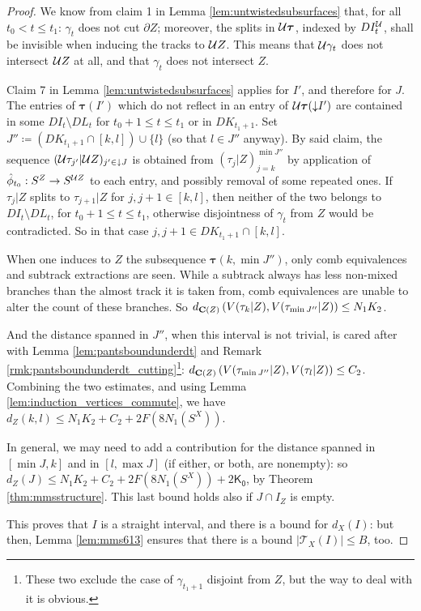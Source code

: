 \begin{proof}
We know from claim 1 in Lemma \ref{lem:untwistedsubsurfaces} that, for all $t_0<t\leq t_1$: $\gamma_t$ does not cut $\partial Z$; moreover, the splits in ${\mathcal U}\bm\tau$, indexed by $DI_t^{\mathcal U}$, shall be invisible when inducing the tracks to ${\mathcal U} Z$. This means that ${\mathcal U}\gamma_t$ does not intersect ${\mathcal U} Z$ at all, and that $\gamma_t$ does not intersect $Z$.

Claim 7 in Lemma \ref{lem:untwistedsubsurfaces} applies for $I'$, and therefore for $J$. The entries of $\bm\tau(I')$ which do not reflect in an entry of ${\mathcal U}\bm\tau(\mathord{\downarrow} I')$ are contained in some $DI_t\setminus DL_t$ for $t_0+1\leq t\leq t_1$ or in $DK_{t_1+1}$. Set $J''\coloneqq \left(DK_{t_1+1}\cap [k,l]\right)\cup \{l\}$ (so that $l\in J''$ anyway). By said claim, the sequence $({\mathcal U}\tau_{j'}|{\mathcal U} Z)_{j'\in \mathord{\downarrow} J}$ is obtained from $(\tau_j|Z)_{j=k}^{\min J''}$ by application of $\hat \phi_{t_0}:S^Z\rightarrow S^{{\mathcal U} Z}$ to each entry, and possibly removal of some repeated ones. If $\tau_j|Z$ splits to $\tau_{j+1}|Z$ for $j,j+1\in [k,l]$, then neither of the two belongs to $DI_t\setminus DL_t$, for $t_0+1\leq t\leq t_1$, otherwise disjointness of $\gamma_t$ from $Z$ would be contradicted. So in that case $j,j+1\in DK_{t_1+1}\cap [k,l]$.

When one induces to $Z$ the subsequence $\bm\tau(k, \min J'')$, only comb equivalences and subtrack extractions are seen. While a subtrack always has less non-mixed branches than the almost track it is taken from, comb equivalences are unable to alter the count of these branches. So $d_{\mathbf C(Z)}\left(V(\tau_k|Z),V(\tau_{\min J''}|Z)\right)\leq N_1K_2$.

And the distance spanned in $J''$, when this interval is not trivial, is cared after with Lemma \ref{lem:pantsboundunderdt} and Remark \ref{rmk:pantsboundunderdt_cutting}\footnote{These two exclude the case of $\gamma_{t_1+1}$ disjoint from $Z$, but the way to deal with it is obvious.}: $d_{\mathbf C(Z)}\left(V(\tau_{\min J''}|Z),V(\tau_l|Z)\right)\leq C_2$. Combining the two estimates, and using Lemma \ref{lem:induction_vertices_commute}, we have $d_Z(k,l)\leq N_1K_2 + C_2 + 2 F\left(8N_1(S^X)\right)$.

In general, we may need to add a contribution for the distance spanned in $[\min J,k]$ and in $[l,\max J]$ (if either, or both, are nonempty): so $d_Z(J)\leq N_1K_2 + C_2 + 2 F\left(8N_1(S^X)\right)+2\mathsf{K_0}$, by Theorem \ref{thm:mmsstructure}. This last bound holds also if $J\cap I_Z$ is empty.

This proves that $I$ is a straight interval, and there is a bound for $d_X(I)$: but then, Lemma \ref{lem:mms613} ensures that there is a bound $|\mathcal T_X(I)|\leq B$, too.
\end{proof}

